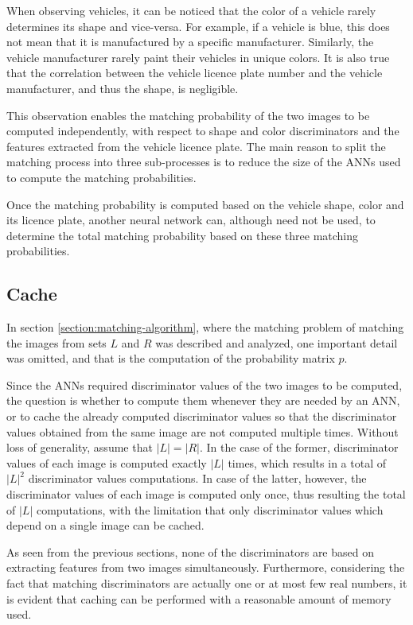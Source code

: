 \documentclass[times, utf8, zavrsni]{fer}
\begin{document}
When observing vehicles, it can be noticed that the color of a vehicle rarely
determines its shape and vice-versa. For example, if a vehicle is blue, this
does not mean that it is manufactured by a specific manufacturer. Similarly, the
vehicle manufacturer rarely paint their vehicles in unique colors. It is also
true that the correlation between the vehicle licence plate number and the
vehicle manufacturer, and thus the shape, is negligible.

This observation enables the matching probability of the two images to be
computed independently, with respect to shape and color discriminators and the
features extracted from the vehicle licence plate. The main reason to split the
matching process into three sub-processes is to reduce the size of the ANNs used
to compute the matching probabilities.

Once the matching probability is computed based on the vehicle shape, color and
its licence plate, another neural network can, although need not be used,
to determine the total matching probability based on these three matching
probabilities.

\subsection{Cache}

In section \ref{section:matching-algorithm}, where the matching problem of
matching the images from sets $L$ and $R$ was described and analyzed, one
important detail was omitted, and that is the computation of the probability
matrix $p$.

Since the ANNs required discriminator values of the two images to be computed,
the question is whether to compute them whenever they are needed by an ANN, or
to cache the already computed discriminator values so that the discriminator
values obtained from the same image are not computed multiple times. Without
loss of generality, assume that $|L| = |R|$. In the case of the former,
discriminator values of each image is computed exactly $|L|$ times, which
results in a total of $|L|^2$ discriminator values computations. In case of the
latter, however, the discriminator values of each image is computed only once,
thus resulting the total of $|L|$ computations, with the limitation that only
discriminator values which depend on a single image can be cached.

As seen from the previous sections, none of the discriminators are based on
extracting features from two images simultaneously. Furthermore, considering the
fact that matching discriminators are actually one or at most few real numbers,
it is evident that caching can be performed with a reasonable amount of
memory used.
\end{document}

